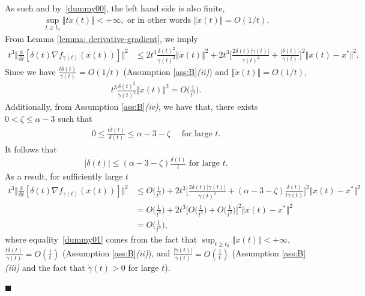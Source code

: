\documentclass[11pt]{article}
\numberwithin{equation}{section}
\newenvironment{proof}{\bigskip\noindent{\bf Proof.}}{\hfill $\blacksquare$ \par\bigskip\noindent}
\begin{document}
\begin{proof}
As such and by~\eqref{dummy00}, the left hand side is also finite, 
\begin{align*}
    \sup_{t \geq t_0} \Vert t \dot{x}(t) \Vert <+\infty, \text{ or in other words }  \Vert \dot{x}(t)\Vert = O(1/t).
\end{align*}
From Lemma \ref{lemma: derivative-gradient}, we imply 
\begin{align*}
    t^3\Big\Vert \frac{\mathrm{d}}{\mathrm{d}t}[\delta(t)\nabla f_{\gamma(t)}(x(t))] \Big \Vert^2 &\le 2t^3\frac{\delta(t)^2}{\gamma(t)^2}\Vert \dot{x}(t) \Vert^2+2t^3\Big[\frac{2\delta(t)\vert \dot{\gamma}(t)\vert}{\gamma(t)^2}+\frac{\vert \dot{\delta}(t)\vert}{\gamma(t)}\Big]^2\Vert x(t)-x^*\Vert^2.
\end{align*}
Since we have $\frac{t\delta (t)}{\gamma(t)}=O(1/t)$ (Assumption \ref{ass:B}\textit{(ii)}) and $\Vert \dot{x}(t) \Vert=O(1/t)$, 
\begin{align*}
t^3\frac{\delta(t)^2}{\gamma(t)^2}\Vert \dot{x}(t) \Vert^2=O\Big(\frac{1}{t^3}\Big). 
\end{align*}
Additionally, from Assumption \ref{ass:B}\textit{(iv)}, we have that, there exists $0<\zeta\le\alpha-3$ such that 
    \begin{align*}
0 \le \frac{t\dot{\delta}(t)}{\delta(t)} \le \alpha-3-\zeta \quad\text{ for large } t.
\end{align*}
It follows that 
\begin{align}
\label{ine: upper bound of derivative of delta}
 \vert \dot{\delta}(t) \vert \le (\alpha-3-\zeta)\frac{\delta(t)}{t} \text{ for large } t.
\end{align}
As a result, for sufficiently large $t$ 
\begin{align}
\label{ine: bounding hessian}
    t^3\Big\Vert\frac{\mathrm{d}}{\mathrm{d}t}[\delta(t)\nabla f_{\gamma(t)}(x(t))] \Big \Vert^2 &\le O\Big(\frac{1}{t^3}\Big)+2t^3\Big[\frac{2\delta(t)\vert \dot{\gamma}(t)\vert}{\gamma(t)^2}+(\alpha-3-\zeta)\frac{\delta(t)}{t\gamma(t)}\Big]^2\Vert x(t)-x^*\Vert^2  \\
    &=O\Big(\frac{1}{t^3}\Big)+2t^3\Big[O\Big(\frac{1}{t^3}\Big)+O\Big(\frac{1}{t^3}\Big)\Big]^2\Vert x(t)-x^*\Vert^2\label{dummy01}\\
    &=O\Big(\frac{1}{t^3}\Big),
\end{align}
where equality~\eqref{dummy01} comes from the fact that $\sup_{t \geq t_0}\Vert x(t)\Vert <+\infty$, $\frac{t\delta(t)}{\gamma(t)}=O(\frac{1}{t})$ (Assumption \ref{ass:B}\textit{(ii)}), and $\frac{\vert \dot{\gamma}(t)\vert}{\gamma(t)}=O(\frac{1}{t})$ (Assumption \ref{ass:B}\textit{(iii)} and the fact that $\dot{\gamma}(t)>0$ for large $t$). 


\end{proof}
\end{document}
